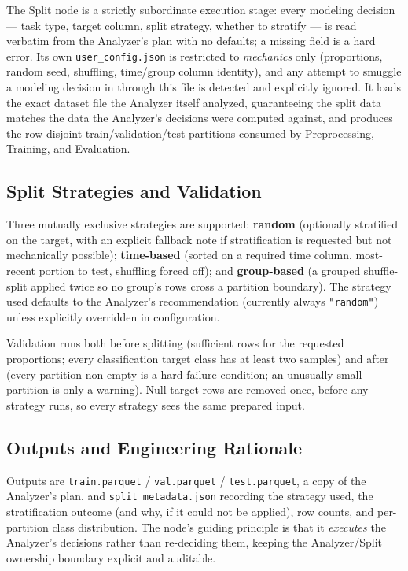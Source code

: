 The Split node is a strictly subordinate execution stage: every modeling decision --- task type, target column, split strategy, whether to stratify --- is read verbatim from the Analyzer's plan with no defaults; a missing field is a hard error. Its own \texttt{user\_config.json} is restricted to \emph{mechanics} only (proportions, random seed, shuffling, time/group column identity), and any attempt to smuggle a modeling decision in through this file is detected and explicitly ignored. It loads the exact dataset file the Analyzer itself analyzed, guaranteeing the split data matches the data the Analyzer's decisions were computed against, and produces the row-disjoint train/validation/test partitions consumed by Preprocessing, Training, and Evaluation.

\subsection{Split Strategies and Validation}
\label{subsec:split-strategies}

Three mutually exclusive strategies are supported: \textbf{random} (optionally stratified on the target, with an explicit fallback note if stratification is requested but not mechanically possible); \textbf{time-based} (sorted on a required time column, most-recent portion to test, shuffling forced off); and \textbf{group-based} (a grouped shuffle-split applied twice so no group's rows cross a partition boundary). The strategy used defaults to the Analyzer's recommendation (currently always \texttt{"random"}) unless explicitly overridden in configuration.

Validation runs both before splitting (sufficient rows for the requested proportions; every classification target class has at least two samples) and after (every partition non-empty is a hard failure condition; an unusually small partition is only a warning). Null-target rows are removed once, before any strategy runs, so every strategy sees the same prepared input.

\subsection{Outputs and Engineering Rationale}
\label{subsec:split-outputs}

Outputs are \texttt{train.parquet} / \texttt{val.parquet} / \texttt{test.parquet}, a copy of the Analyzer's plan, and \texttt{split\_metadata.json} recording the strategy used, the stratification outcome (and why, if it could not be applied), row counts, and per-partition class distribution. The node's guiding principle is that it \emph{executes} the Analyzer's decisions rather than re-deciding them, keeping the Analyzer/Split ownership boundary explicit and auditable.

